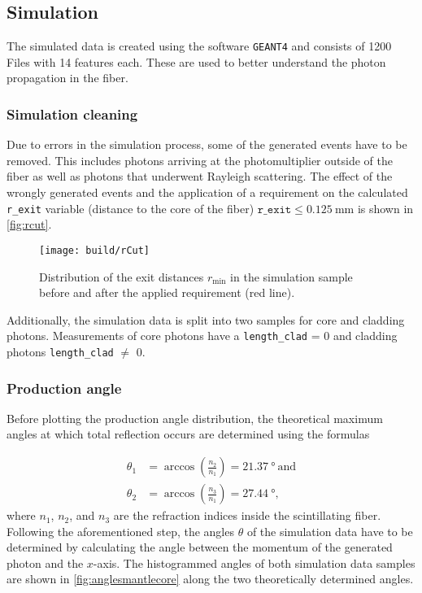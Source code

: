 \subsection{Simulation}

The simulated data is created using the software \texttt{GEANT4} and consists of 1200 Files with 14 features each. 
These are used to better understand the photon propagation in the fiber. 
\subsubsection{Simulation cleaning}
Due to errors in the simulation process, some of the generated events have to be removed. 
This includes photons arriving at the photomultiplier outside of the fiber as well as photons that underwent Rayleigh scattering. 
The effect of the wrongly generated events and the application of a requirement on the calculated \texttt{r\_exit} variable 
(distance to the core of the fiber) $\mathtt{r\_exit}\leq \qty{0.125}{\milli\meter}$ is shown in \autoref{fig:rcut}.

\begin{figure}[H]
	\centering
	\texttt{[image: build/rCut]}
	\caption{Distribution of the exit distances $r_\mathrm{min}$ in the simulation sample before and after the applied requirement (red line).}
	\label{fig:rcut}
\end{figure}

Additionally, the simulation data is split into two samples for core and cladding photons. Measurements of core photons have a \texttt{length\_clad} = 0 and cladding photons \texttt{length\_clad} $\neq$ 0.

\subsubsection{Production angle}
Before plotting the production angle distribution, the theoretical maximum angles at which total reflection occurs are determined using the formulas

\begin{align*}
	\theta_1 &= \arccos\left(\frac{n_2}{n_1}\right) = \qty{21.37}{\degree}\ \mathrm{and}\\
	\theta_2 &= \arccos\left(\frac{n_3}{n_1}\right) = \qty{27.44}{\degree},
\end{align*}
where $n_1$, $n_2$, and $n_3$ are the refraction indices inside the scintillating fiber.
Following the aforementioned step, the angles $\theta$ of the simulation data have to be determined by 
calculating the angle between the momentum of the generated photon and the $x$-axis. 
The histogrammed angles of both simulation data samples are shown in \autoref{fig:anglesmantlecore} along the two theoretically determined angles.


